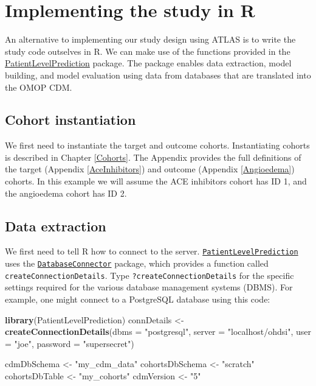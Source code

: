\documentclass[11pt]{book}
\newenvironment{Shaded}{\begin{snugshade}}{\end{snugshade}}
\newcommand{\DataTypeTok}[1]{\textcolor[rgb]{0.13,0.29,0.53}{#1}}
\newcommand{\KeywordTok}[1]{\textcolor[rgb]{0.13,0.29,0.53}{\textbf{#1}}}
\newcommand{\NormalTok}[1]{#1}
\newcommand{\StringTok}[1]{\textcolor[rgb]{0.31,0.60,0.02}{#1}}
\theoremstyle{definition}
\theoremstyle{definition}
\theoremstyle{definition}
\theoremstyle{remark}
\begin{document}
\hypertarget{implementing-the-study-in-r}{%
\section{Implementing the study in R}\label{implementing-the-study-in-r}}

An alternative to implementing our study design using ATLAS is to write the study code outselves in R. We can make use of the functions provided in the \href{https://ohdsi.github.io/PatientLevelPrediction/}{PatientLevelPrediction} package. The package enables data extraction, model building, and model evaluation using data from databases that are translated into the OMOP CDM.

\hypertarget{cohort-instantiation-2}{%
\subsection{Cohort instantiation}\label{cohort-instantiation-2}}

We first need to instantiate the target and outcome cohorts. Instantiating cohorts is described in Chapter \ref{Cohorts}. The Appendix provides the full definitions of the target (Appendix \ref{AceInhibitors}) and outcome (Appendix \ref{Angioedema}) cohorts. In this example we will assume the ACE inhibitors cohort has ID 1, and the angioedema cohort has ID 2.

\hypertarget{data-extraction-3}{%
\subsection{Data extraction}\label{data-extraction-3}}

We first need to tell R how to connect to the server. \href{https://ohdsi.github.io/PatientLevelPrediction/}{\texttt{PatientLevelPrediction}} uses the \href{https://ohdsi.github.io/DatabaseConnector/}{\texttt{DatabaseConnector}} package, which provides a function called \texttt{createConnectionDetails}. Type \texttt{?createConnectionDetails} for the specific settings required for the various database management systems (DBMS). For example, one might connect to a PostgreSQL database using this code:

\begin{Shaded}
\begin{Highlighting}[]
\KeywordTok{library}\NormalTok{(PatientLevelPrediction)}
\NormalTok{connDetails <-}\StringTok{ }\KeywordTok{createConnectionDetails}\NormalTok{(}\DataTypeTok{dbms =} \StringTok{"postgresql"}\NormalTok{,}
                                       \DataTypeTok{server =} \StringTok{"localhost/ohdsi"}\NormalTok{,}
                                       \DataTypeTok{user =} \StringTok{"joe"}\NormalTok{,}
                                       \DataTypeTok{password =} \StringTok{"supersecret"}\NormalTok{)}

\NormalTok{cdmDbSchema <-}\StringTok{ "my_cdm_data"}
\NormalTok{cohortsDbSchema <-}\StringTok{ "scratch"}
\NormalTok{cohortsDbTable <-}\StringTok{ "my_cohorts"}
\NormalTok{cdmVersion <-}\StringTok{ "5"}
\end{Highlighting}
\end{Shaded}
\end{document}

